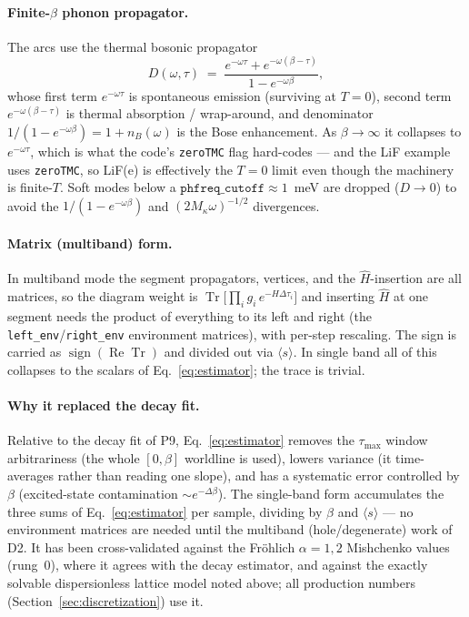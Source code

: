 \documentclass[11pt]{article}
\begin{document}
\paragraph{Finite-$\beta$ phonon propagator.}
The arcs use the thermal bosonic propagator
\begin{equation}
  D(\omega,\tau) \;=\; \frac{e^{-\omega\tau}+e^{-\omega(\beta-\tau)}}{1-e^{-\omega\beta}},
  \label{eq:dph}
\end{equation}
whose first term $e^{-\omega\tau}$ is spontaneous emission (surviving at $T=0$), second
term $e^{-\omega(\beta-\tau)}$ is thermal absorption / wrap-around, and denominator
$1/(1-e^{-\omega\beta})=1+n_{B}(\omega)$ is the Bose enhancement. As $\beta\to\infty$ it
collapses to $e^{-\omega\tau}$, which is what the code's \texttt{zeroTMC} flag
hard-codes --- and the LiF example uses \texttt{zeroTMC}, so LiF(e) is effectively the
$T=0$ limit even though the machinery is finite-$T$. Soft modes below a
$\texttt{phfreq\_cutoff}\approx1$~meV are dropped ($D\to0$) to avoid the
$1/(1-e^{-\omega\beta})$ and $(2M_{\kappa}\omega)^{-1/2}$ divergences.

\paragraph{Matrix (multiband) form.}

In multiband mode the segment propagators, vertices, and the $\hat H$-insertion are all matrices, so the diagram weight is $\operatorname{Tr}\!\bigl[\prod_{i}g_{i}\,e^{-H\Delta\tau_{i}}\bigr]$ and inserting $\hat H$ at one segment needs the product of everything to its left and right (the \texttt{left\_env}/\texttt{right\_env} environment matrices), with per-step rescaling. The sign is carried as $\operatorname{sign}(\operatorname{Re}\operatorname{Tr})$ and divided out via $\langle s\rangle$. In single band all of this collapses to the scalars of Eq.~\eqref{eq:estimator}; the trace is trivial.

\paragraph{Why it replaced the decay fit.}

Relative to the decay fit of P9, Eq.~\eqref{eq:estimator} removes the $\tau_{\max}$ window arbitrariness (the whole $[0,\beta]$ worldline is used), lowers variance (it time-averages rather than reading one slope), and has a systematic error controlled by $\beta$ (excited-state contamination $\sim e^{-\Delta\beta}$). The single-band form accumulates the three sums of Eq.~\eqref{eq:estimator} per sample, dividing by $\beta$ and $\langle s\rangle$ --- no environment matrices are needed until the multiband (hole/degenerate) work of D2. It has been cross-validated against the Fr\"ohlich $\alpha=1,2$ Mishchenko values (rung~0), where it agrees with the decay estimator, and against the exactly solvable dispersionless lattice model noted above; all production numbers (Section~\ref{sec:discretization}) use it.
\end{document}
